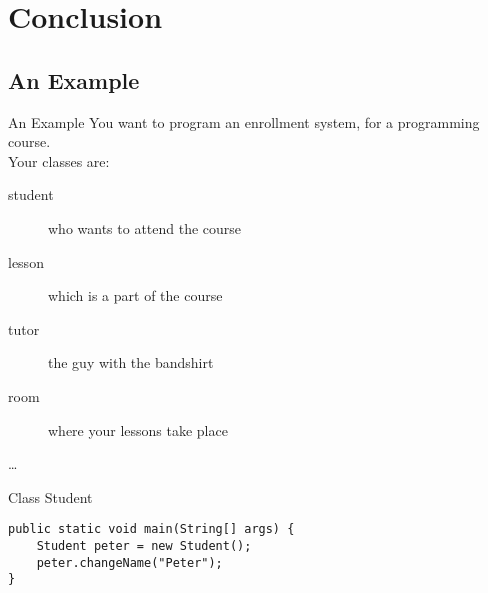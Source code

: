 \section{Conclusion}
\subsection{An Example}

\begin{frame}{An Example}
	You want to program an enrollment system, for a programming course. \\
	\vspace{1em}
	Your classes are:\\
	\begin{description}
		\item[student] who wants to attend the course
		\item[lesson] which is a part of the course
		\item[tutor] the guy with the bandshirt
		\item[room] where your lessons take place
		\item[\dots]
	\end{description}
\end{frame}


\begin{frame}[fragile]{Class Student}
\begin{lstlisting}
public static void main(String[] args) {
	Student peter = new Student();
	peter.changeName("Peter");
}
\end{lstlisting}
\end{frame}

